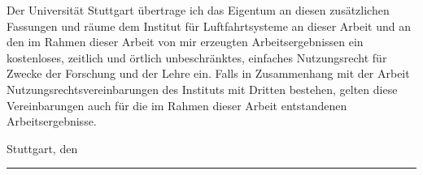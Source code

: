 Der Universit{\"a}t Stuttgart {\"u}bertrage ich das Eigentum an diesen zus{\"a}tzlichen Fassungen und r{\"a}ume dem Institut f{\"u}r Luftfahrtsysteme an dieser Arbeit und an den im Rahmen dieser Arbeit von mir erzeugten Arbeitsergebnissen ein kostenloses, zeitlich und {\"o}rtlich unbeschr{\"a}nktes, einfaches Nutzungsrecht f{\"u}r Zwecke der Forschung und der Lehre ein. Falls in Zusammenhang mit der Arbeit Nutzungsrechtsvereinbarungen des Instituts mit Dritten bestehen, gelten diese Vereinbarungen auch f{\"u}r die im Rahmen dieser Arbeit entstandenen Arbeitsergebnisse.

\vspace{2cm}

Stuttgart, den \thedate \hfill \rule{8cm}{0.4pt} \linebreak
\mbox{~} \hfill	\theauthor






